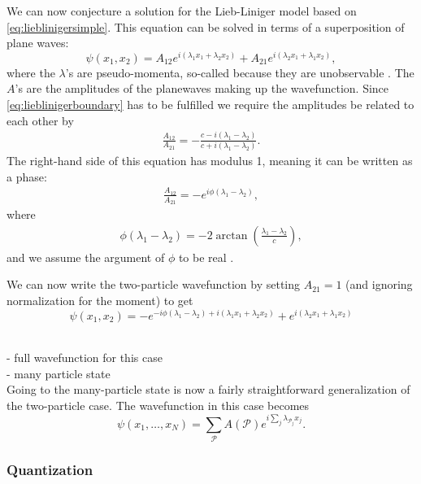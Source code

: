 \documentclass[11pt, a4paper,draft]{report} %
\begin{document}
We can now conjecture a solution for the Lieb-Liniger model based on \cref{eq:lieblinigersimple}.
This equation can be solved in terms of a superposition of plane waves:
\begin{equation}
	\psi(x_1,x_2) = A_{12} e^{i(\lambda_1x_1 + \lambda_2 x_2)} + A_{21} e^{i(\lambda_2 x_1 + \lambda_1 x_2)},
\end{equation}
where the \(\lambda\)'s are pseudo-momenta, so-called because they are unobservable \cite{Franchini2017}.
The \(A\)'s are the amplitudes of the planewaves making up the wavefunction.
Since \cref{eq:lieblinigerboundary} has to be fulfilled we require the amplitudes be related to each other by
\begin{align}
	\frac{A_{12}}{A_{21}} = -\frac{c-i(\lambda_1 - \lambda_2) }{c+i(\lambda_1 - \lambda_2)}.
\end{align}
The right-hand side of this equation has modulus 1, meaning it can be written as a phase:
\begin{align}
	\frac{A_{12}}{A_{21}} = -e^{i\phi(\lambda_1-\lambda_2)},
\end{align}
where
\begin{align}
	\phi(\lambda_1-\lambda_2) = -2\arctan\left(\frac{\lambda_1-\lambda_2}{c}\right),
\end{align}
and we assume the argument of \(\phi\) to be real \cite{Lieb1963}.

We can now write the two-particle wavefunction by setting \(A_{21}=1\) (and ignoring normalization for the moment) to get
\begin{equation}
	\psi(x_1,x_2) = - e^{-i\phi(\lambda_1-\lambda_2)+i(\lambda_1x_1 + \lambda_2 x_2)} + e^{i(\lambda_2 x_1 + \lambda_1 x_2)}
\end{equation}

~\\
- full wavefunction for this case\\
- many particle state\\

Going to the many-particle state is now a fairly straightforward generalization of the two-particle case.
The wavefunction in this case becomes \cite{Franchini2017}
\begin{equation}
	\psi(x_1,\ldots,x_N) = \sum_{\mathcal{P}} A(\mathcal{P}) e^{i\sum_j \lambda_{\mathcal{P}_j} x_j}.
\end{equation}

\subsubsection{Quantization}
\end{document}
